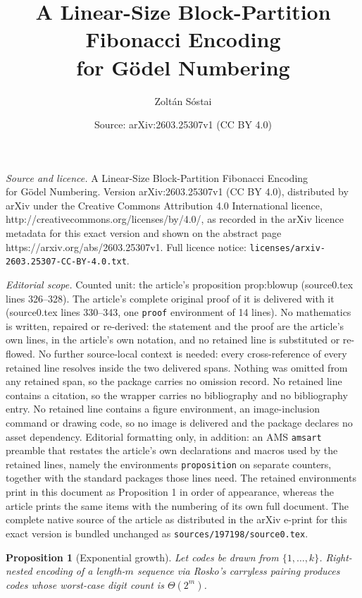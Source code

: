 \documentclass[10pt,a4paper]{amsart}
\title{A Linear-Size Block-Partition Fibonacci Encoding\\for G\"odel Numbering}
\author{Zolt\'an S\'ostai}
\date{Source: arXiv:2603.25307v1 (CC BY 4.0)}
\newtheorem{proposition}{Proposition}
\begin{document}
\maketitle

\noindent\emph{Source and licence.} A Linear-Size Block-Partition Fibonacci Encoding\\for G\"odel Numbering. Version arXiv:2603.25307v1 (CC BY 4.0), distributed by arXiv under the Creative Commons Attribution 4.0 International licence, http://creativecommons.org/licenses/by/4.0/, as recorded in the arXiv licence metadata for this exact version and shown on the abstract page https://arxiv.org/abs/2603.25307v1. Full licence notice: \texttt{licenses/arxiv-2603.25307-CC-BY-4.0.txt}.\par\smallskip

\noindent\textit{Editorial scope.} Counted unit: the article's proposition prop:blowup (source0.tex lines 326--328). The article's complete original proof of it is delivered with it (source0.tex lines 330--343, one \texttt{proof} environment of 14 lines). No mathematics is written, repaired or re-derived: the statement and the proof are the article's own lines, in the article's own notation, and no retained line is substituted or re-flowed.  No further source-local context is needed: every cross-reference of every retained line resolves inside the two delivered spans.  Nothing was omitted from any retained span, so the package carries no omission record.  No retained line contains a citation, so the wrapper carries no bibliography and no bibliography entry.  No retained line contains a figure environment, an image-inclusion command or drawing code, so no image is delivered and the package declares no asset dependency.  Editorial formatting only, in addition: an AMS \texttt{amsart} preamble that restates the article's own declarations and macros used by the retained lines, namely the environments \texttt{proposition} on separate counters, together with the standard packages those lines need.  The retained environments print in this document as Proposition 1 in order of appearance, whereas the article prints the same items with the numbering of its own full document.  The complete native source of the article as distributed in the arXiv e-print for this exact version is bundled unchanged as \texttt{sources/197198/source0.tex}.
\begin{proposition}[Exponential growth]\label{prop:blowup}
Let codes be drawn from $\{1,\ldots,k\}$. Right-nested encoding of a length-$m$ sequence via Rosko's carryless pairing produces codes whose worst-case digit count is $\Theta(2^m)$.
\end{proposition}
\end{document}
